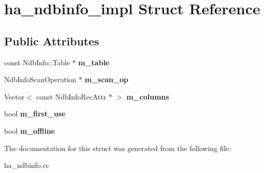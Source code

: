 \hypertarget{structha__ndbinfo__impl}{}\section{ha\+\_\+ndbinfo\+\_\+impl Struct Reference}
\label{structha__ndbinfo__impl}
\subsection*{Public Attributes}
\begin{DoxyCompactItemize}
\item 
\mbox{\label{structha__ndbinfo__impl_a965fc3806384e581fc7952c27988189b}} 
const Ndb\+Info\+::\+Table $\ast$ {\bfseries m\+\_\+table}
\item 
\mbox{\label{structha__ndbinfo__impl_a8c469e1783c8761fbf5f7d16e76eeaa4}} 
Ndb\+Info\+Scan\+Operation $\ast$ {\bfseries m\+\_\+scan\+\_\+op}
\item 
\mbox{\label{structha__ndbinfo__impl_accb1161de7d99692b0c0b0fcfbcd73e4}} 
Vector$<$ const Ndb\+Info\+Rec\+Attr $\ast$ $>$ {\bfseries m\+\_\+columns}
\item 
\mbox{\label{structha__ndbinfo__impl_a7c1d651f03d674b6d6dbd0634bdb0662}} 
bool {\bfseries m\+\_\+first\+\_\+use}
\item 
\mbox{\label{structha__ndbinfo__impl_a1b9937f3cda871b3a599e77910627284}} 
bool {\bfseries m\+\_\+offline}
\end{DoxyCompactItemize}


The documentation for this struct was generated from the following file\+:\begin{DoxyCompactItemize}
\item 
ha\+\_\+ndbinfo.\+cc\end{DoxyCompactItemize}
